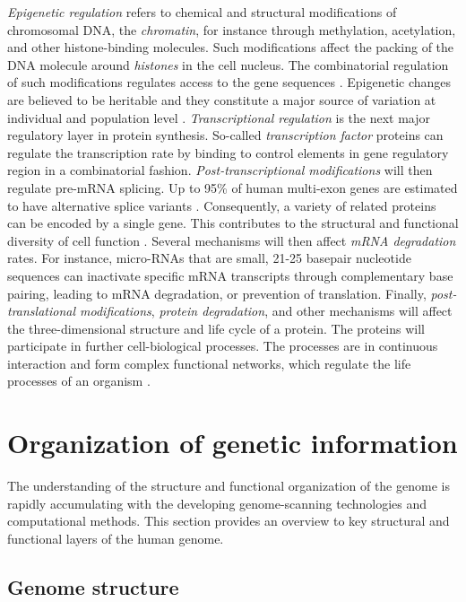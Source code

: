 {\it Epigenetic regulation} refers to chemical and structural
modifications of chromosomal DNA, the {\it chromatin}, for instance
through methylation, acetylation, and other histone-binding molecules.
Such modifications affect the packing of the DNA molecule around {\it
  histones} in the cell nucleus. The combinatorial regulation of such
modifications regulates access to the gene sequences
\citep{Gibney2010}. Epigenetic changes are believed to be heritable
and they constitute a major source of variation at individual and
population level \citep{Johnson2010}. {\it Transcriptional regulation}
is the next major regulatory layer in protein synthesis. So-called
{\it transcription factor} proteins can regulate the transcription
rate by binding to control elements in gene regulatory region in a
combinatorial fashion. {\it Post-transcriptional modifications} will
then regulate pre-mRNA splicing. Up to 95\% of human multi-exon genes
are estimated to have alternative splice variants
\citep{Pan2008}. Consequently, a variety of related proteins can be
encoded by a single gene. This contributes to the structural and
functional diversity of cell function \citep{Stetefeld2005}. Several
mechanisms will then affect {\it mRNA degradation} rates. For
instance, micro-RNAs that are small, 21-25 basepair nucleotide
sequences can inactivate specific mRNA transcripts through
complementary base pairing, leading to mRNA degradation, or prevention
of translation. Finally, {\it post-translational modifications}, {\it
  protein degradation}, and other mechanisms will affect the
three-dimensional structure and life cycle of a protein. The proteins
will participate in further cell-biological processes. The processes
are in continuous interaction and form complex functional networks,
which regulate the life processes of an organism \citep{Alberts02}.

\section{Organization of genetic information}

The understanding of the structure and functional organization of the
genome is rapidly accumulating with the developing genome-scanning
technologies and computational methods. This section provides an
overview to key structural and functional layers of the human genome.

\subsection{Genome structure}

